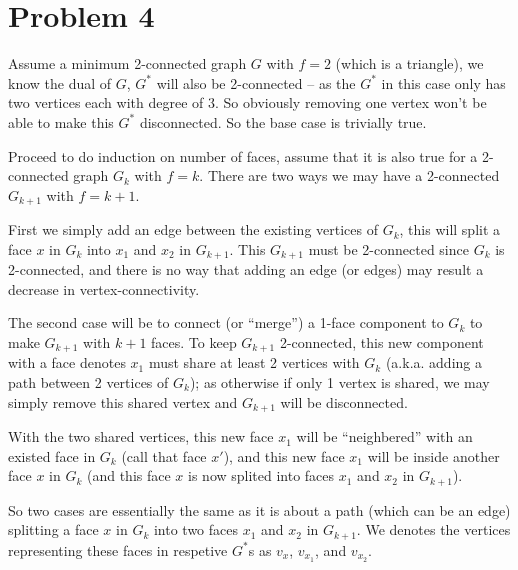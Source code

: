 \documentclass[11pt]{article}
\begin{document}
%
%






\section*{Problem 4}


Assume a minimum 2-connected graph $G$ with $f = 2$ (which is a triangle), we know the dual of $G$, $G^*$ will also be 2-connected -- as the $G^*$ in this case only has two vertices each with degree of $3$. So obviously removing one vertex won't be able to make this $G^*$ disconnected. So the base case is trivially true.\newline

Proceed to do induction on number of faces, assume that it is also true for a 2-connected graph $G_k$ with $f=k$. There are two ways we may have a 2-connected $G_{k+1}$ with $f = k+1$.\newline

First we simply add an edge between the existing vertices of $G_k$, this will split a face $x$ in $G_k$ into $x_1$ and $x_2$ in $G_{k+1}$. This $G_{k+1}$ must be 2-connected since $G_k$ is 2-connected, and there is no way that adding an edge (or edges) may result a decrease in vertex-connectivity.

The second case will be to connect (or ``merge'') a 1-face component to $G_k$ to make $G_{k+1}$ with $k+1$ faces. To keep $G_{k+1}$ 2-connected, this new component with a face denotes $x_1$ must share at least 2 vertices with $G_k$ (a.k.a. adding a path between 2 vertices of  $G_k$); as otherwise if only 1 vertex is shared, we may simply remove this shared vertex and $G_{k+1}$ will be disconnected.

With the two shared vertices, this new face $x_1$ will be ``neighbered'' with an existed face in $G_k$ (call that face $x'$), and this new face $x_1$ will be inside another face $x$ in $G_k$ (and this face $x$ is now splited into faces $x_1$ and $x_2$ in $G_{k+1}$).\newline

So two cases are essentially the same as it is about a path (which can be an edge) splitting a face $x$ in $G_k$ into two faces $x_1$ and $x_2$ in $G_{k+1}$. We denotes the vertices representing these faces in respetive $G^*$s as $v_x$, $v_{x_1}$, and $v_{x_2}$.
\end{document}
